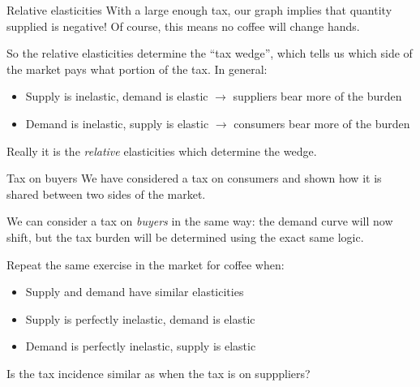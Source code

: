 \documentclass[aspectratio=169]{beamer}
\begin{document}
\begin{frame}{Relative elasticities}
    With a large enough tax, our graph implies that quantity supplied is negative! Of course, this means no coffee will change hands.

    \vspace{5mm}

    So the relative elasticities determine the ``tax wedge'', which tells us which side of the market pays what portion of the tax. In general:
    \begin{itemize}
        \item Supply is inelastic, demand is elastic $\to$ suppliers bear more of the burden
        \item Demand is inelastic, supply is elastic $\to$ consumers bear more of the burden
    \end{itemize}

    \vspace{5mm}

    Really it is the \textit{relative} elasticities which determine the wedge.
\end{frame}

\begin{frame}{Tax on buyers}
    We have considered a tax on consumers and shown how it is shared between two sides of the market.

    \vspace{5mm}

    We can consider a tax on \textit{buyers} in the same way: the demand curve will now shift, but the tax burden will be determined using the exact same logic.

    \vspace{5mm}

    Repeat the same exercise in the market for coffee when:
    \begin{itemize}
        \item Supply and demand have similar elasticities
        \item Supply is perfectly inelastic, demand is elastic
        \item Demand is perfectly inelastic, supply is elastic
    \end{itemize}
    Is the tax incidence similar as when the tax is on supppliers?
\end{frame}
\end{document}
